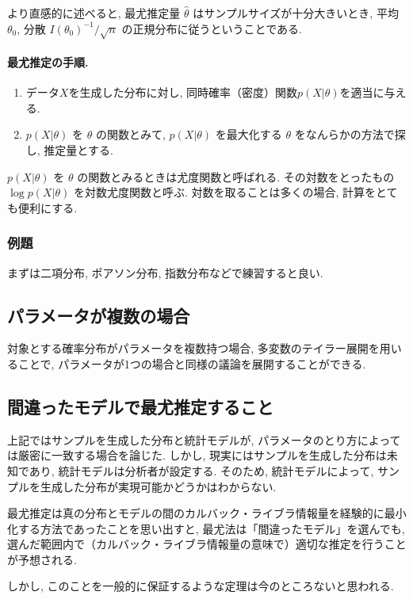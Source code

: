 \documentclass{jarticle}
\begin{document}
より直感的に述べると, 最尤推定量 $\hat \theta$ はサンプルサイズが十分大きいとき, 平均 $\theta_0$, 分散 $I(\theta_0)^{-1}/\sqrt{n}$ の正規分布に従うということである. 

\paragraph{最尤推定の手順.} 
\begin{enumerate}
\item データ$X$を生成した分布に対し, 同時確率（密度）関数$p(X|\theta)$を適当に与える. 
\item $p(X|\theta)$ を $\theta$ の関数とみて, $p(X|\theta)$ を最大化する $\theta$ をなんらかの方法で探し, 推定量とする.
\end{enumerate}
$p(X|\theta)$ を $\theta$ の関数とみるときは尤度関数と呼ばれる. その対数をとったもの $\log p(X|\theta)$ を対数尤度関数と呼ぶ. 対数を取ることは多くの場合, 計算をとても便利にする. 

\subsubsection{例題}
まずは二項分布, ポアソン分布, 指数分布などで練習すると良い.

\subsection{パラメータが複数の場合}

対象とする確率分布がパラメータを複数持つ場合, 多変数のテイラー展開を用いることで, パラメータが1つの場合と同様の議論を展開することができる. 



\subsection{間違ったモデルで最尤推定すること}
上記ではサンプルを生成した分布と統計モデルが, パラメータのとり方によっては厳密に一致する場合を論じた. しかし, 現実にはサンプルを生成した分布は未知であり, 統計モデルは分析者が設定する. そのため, 統計モデルによって, サンプルを生成した分布が実現可能かどうかはわからない. 

最尤推定は真の分布とモデルの間のカルバック・ライブラ情報量を経験的に最小化する方法であったことを思い出すと, 最尤法は「間違ったモデル」を選んでも, 選んだ範囲内で（カルバック・ライブラ情報量の意味で）適切な推定を行うことが予想される. 

しかし, このことを一般的に保証するような定理は今のところないと思われる. 
\end{document}
